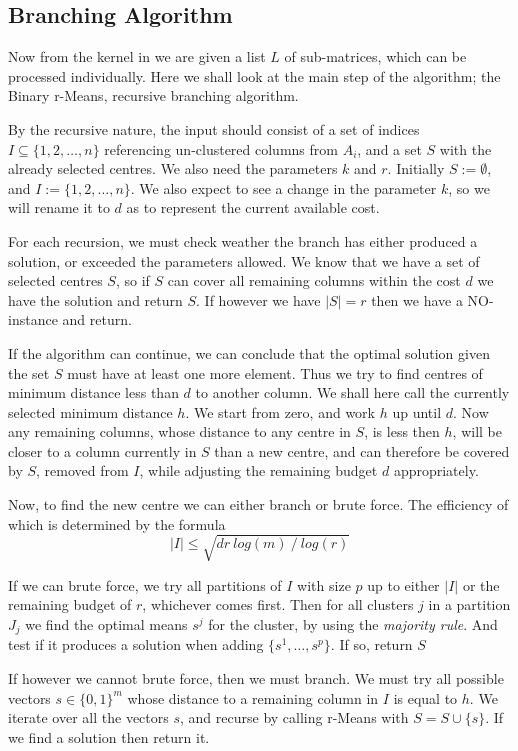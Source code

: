 \documentclass[a4paper]{article}
\begin{document}
\subsection{Branching Algorithm}
\label{sec:algo:branching}
Now from the kernel in  we are given a list $L$ of sub-matrices, which can be processed individually. Here we
shall look at the main step of the algorithm; the Binary r-Means, recursive branching algorithm.

By the recursive nature, the input should consist of a set of indices $I \subseteq \{1,2,\dots,n\}$ referencing un-clustered
columns from $A_i$, and a set $S$ with the already selected centres. We also need the parameters $k$ and $r$. Initially 
$S := \emptyset$, and $I := \{1,2,\dots,n\}$. We also expect to see a change in the parameter $k$, so we will rename it to 
$d$ as to represent the current available cost.

For each recursion, we must check weather the branch has either produced a solution, or exceeded the parameters allowed. We know that
we have a set of selected centres $S$, so if $S$ can cover all remaining columns within the cost $d$ we have the solution and return $S$.
If however we have $|S| = r$ then we have a NO-instance and return.

If the algorithm can continue, we can conclude that the optimal solution given the set $S$ must have at least one more element. Thus
we try to find centres of minimum distance less than $d$ to another column. We shall here call the currently selected minimum
distance $h$. We start from zero, and work $h$ up until $d$. Now any remaining columns, whose distance to any centre in $S$,
is less then $h$, will be closer to a column currently in $S$ than a new centre, and can therefore be covered by $S$,
removed from $I$, while adjusting the remaining budget $d$ appropriately.

Now, to find the new centre we can either branch or brute force. The efficiency of which is determined by the formula
\[
    |I| \leq \sqrt{d r ~log(m) ~/ ~log(r)}
\]

If we can brute force, we try all partitions of $I$ with size $p$ up to either $|I|$ or the remaining budget of $r$, whichever comes first. Then
for all clusters $j$ in a partition $J_j$ we find the optimal means $s^j$ for the cluster, by using the \textit{majority rule}. And test if it produces
a solution when adding $\{s^1,\dots,s^p\}$. If so, return $S$

If however we cannot brute force, then we must branch. We must try all possible vectors $s \in \{0,1\}^m$ whose distance to a remaining column in $I$
is equal to $h$. We iterate over all the vectors $s$, and recurse by calling r-Means with $S= S\cup\{s\}$. If we find a solution then return it.
\end{document}
